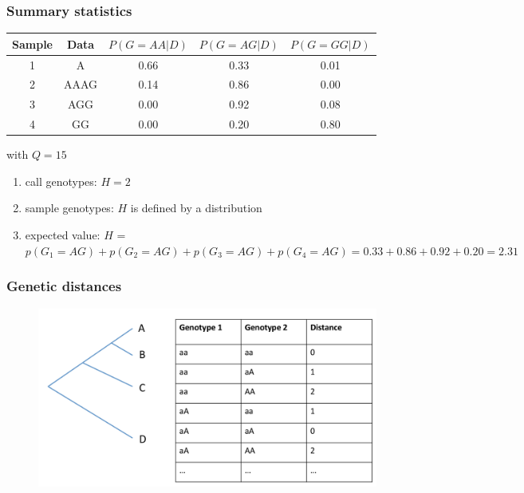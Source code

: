 \begin{frame}
\frametitle{Summary statistics}

        \tiny{
        \begin{center}
                \begin{tabular}{c | c | c | c | c}
                        Sample & Data & $P(G=AA|D)$ & $P(G=AG|D)$ & $P(G=GG|D)$\\
                        \hline
                        1 & A & 0.66 & 0.33 & 0.01\\
                        2 & AAAG & 0.14 & 0.86 & 0.00\\
                        3 & AGG & 0.00 & 0.92 & 0.08\\
                        4 & GG & 0.00 & 0.20 & 0.80\\
                        \hline
                \end{tabular}
                with $Q=15$
        \end{center}
        }

	\large{
	\begin{enumerate}
                \item call genotypes: $H=2$
                \item sample genotypes: $H$ is defined by a distribution
		\item expected value: $\hat{H}$ = \pause $p(G_1=AG) + p(G_2=AG) + p(G_3=AG) + p(G_4=AG) = 0.33+0.86+0.92+0.20 = 2.31$
        \end{enumerate}
	}

\end{frame}



\begin{frame}
\frametitle{Genetic distances}

	\begin{figure}
                \includegraphics[width=\textwidth]{Pics/gdist_1.png}
        \end{figure}


\end{frame}

